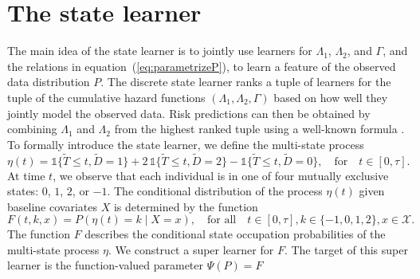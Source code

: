 \documentclass[11pt]{article}
\theoremstyle{thmstyleone}%
\theoremstyle{thmstyletwo}%
\theoremstyle{thmstylethree}%
\newcommand{\includeFigCond}[2][]{
  \ifx\nofig\undefined %
    \texttt{[image: \#2]} %
  \else %
    \texttt{#2} %
  \fi %
}
\newcommand{\1}{\mathds{1}}
\begin{document}
\section{The state learner}
\label{sec:super-learner-simple}

The main idea of the state learner is to jointly use learners for
\( \Lambda_1 \), \( \Lambda_2 \), and \( \Gamma \), and the relations in
equation~(\ref{eq:parametrizeP}), to learn a feature of the observed data
distribution \( P \). The discrete state learner ranks a tuple of learners for
the tuple of the cumulative hazard functions
\( (\Lambda_1, \Lambda_2, \Gamma) \) based on how well they jointly model the
observed data. Risk predictions can then be obtained by combining
\( \Lambda_1 \) and $\Lambda_2$ from the highest ranked tuple using a well-known
formula \citep{benichou1990estimates, ozenne2017riskregression}. To formally
introduce the state learner, we define the multi-state process
\begin{equation*}
  \eta(t) = \1\{\tilde{T} \leq t, \tilde D=1\} + 2\,\1\{\tilde{T} \leq t, \tilde
  D=2\} - \1\{\tilde{T} \leq t, \tilde D=0\},
  \quad \text{for} \quad t \in [0, \tau].
\end{equation*}
At time \(t\), we observe that each individual is in one of four mutually
exclusive states: \( 0 \), \( 1 \), \( 2 \), or \( -1 \).
The conditional distribution of the process \( \eta(t) \) given
baseline covariates \( X \) is determined by the function
\begin{equation}
  \label{eq:F-def}
  F(t, k, x) = P(\eta(t) = k \mid X=x),
  \quad \text{for all} \quad
  t \in [0,\tau],
  k \in \{-1,0,1,2\},
  x \in \mathcal{X}.
\end{equation}
The function \( F \) describes the conditional state occupation probabilities of
the multi-state process \(\eta\). We construct a super learner for \( F \). The
target of this super learner is the function-valued parameter $\Psi(P) = F$
\end{document}
